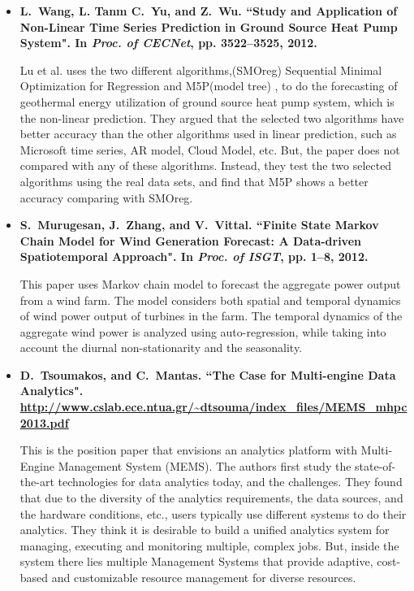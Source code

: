 \documentclass[a4paper,12pt]{llncs}
\newcommand{\et}{et al. }
\begin{document}
\begin{itemize}
\item {\bf L.~Wang, L. Tanm  C.~Yu, and Z.~Wu. ``Study and Application of Non-Linear Time Series Prediction in Ground Source Heat Pump System". In {\em Proc. of CECNet}, pp. 3522--3525, 2012.}

Lu \et uses the two different algorithms,(SMOreg) Sequential Minimal Optimization for Regression \cite{li} and M5P(model tree) \cite{yang}, to do the forecasting of geothermal energy utilization of ground source heat pump system, which is the non-linear prediction. They argued that the selected two algorithms have better accuracy  than the other algorithms used in linear prediction, such as Microsoft time series, AR model, Cloud Model, etc. But, the paper does not compared with any of these algorithms. Instead, they test the two selected algorithms using the real data sets, and find that M5P shows a better accuracy comparing with SMOreg.

\item {\bf S.~Murugesan, J.~Zhang, and V.~Vittal. ``Finite State Markov Chain Model for Wind Generation Forecast: A Data-driven Spatiotemporal Approach". In {\em Proc. of ISGT}, pp. 1--8, 2012.}

This paper uses Markov chain model to forecast the aggregate power output from a wind farm. The model considers both spatial and temporal dynamics of wind power output of turbines in the farm. The temporal dynamics of the aggregate wind power is analyzed using auto-regression, while taking into account the diurnal non-stationarity and the seasonality.

\item {\bf D.~Tsoumakos, and C.~Mantas. ``The Case for Multi-engine Data Analytics". \url{http://www.cslab.ece.ntua.gr/~dtsouma/index_files/MEMS_mhpc2013.pdf}}

This is the position paper that envisions an analytics platform with Multi-Engine Management System (MEMS). 
The authors first study the state-of-the-art technologies for data analytics today, and the challenges. They found that due to the diversity of the analytics requirements, the data sources, and the hardware conditions, etc.,  users typically use different systems to do their analytics. They think it is desirable to build a uniﬁed analytics system for managing, executing and monitoring multiple, complex jobs. But, inside the system there lies multiple Management Systems that provide adaptive, cost-based and customizable resource management for  diverse resources.
\end{itemize}
\end{document}
